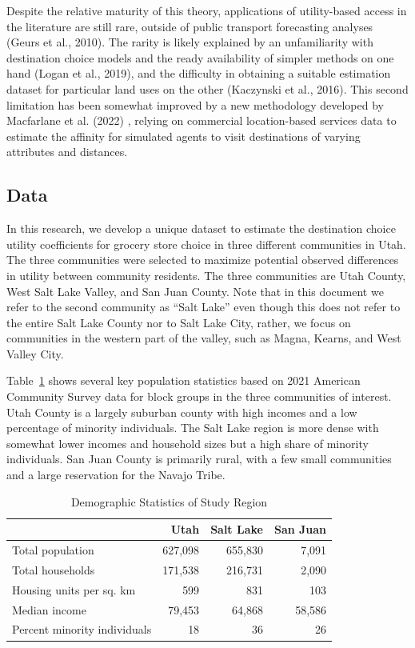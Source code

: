 \documentclass[
  letterpaper,
  authoryear,
  review,
  3p]{elsarticle}
\begin{document}
Despite the relative maturity of this theory, applications of
utility-based access in the literature are still rare, outside of public
transport forecasting analyses (Geurs et al., 2010). The rarity is
likely explained by an unfamiliarity with destination choice models and
the ready availability of simpler methods on one hand (Logan et al.,
2019), and the difficulty in obtaining a suitable estimation dataset for
particular land uses on the other (Kaczynski et al., 2016). This second
limitation has been somewhat improved by a new methodology developed by
Macfarlane et al. (2022) , relying on commercial location-based services
data to estimate the affinity for simulated agents to visit destinations
of varying attributes and distances.

\hypertarget{data}{%
\subsection{Data}\label{data}}

In this research, we develop a unique dataset to estimate the
destination choice utility coefficients for grocery store choice in
three different communities in Utah. The three communities were selected
to maximize potential observed differences in utility between community
residents. The three communities are Utah County, West Salt Lake Valley,
and San Juan County. Note that in this document we refer to the second
community as ``Salt Lake'' even though this does not refer to the entire
Salt Lake County nor to Salt Lake City, rather, we focus on communities
in the western part of the valley, such as Magna, Kearns, and West
Valley City.

Table~\ref{tbl-acsdata} shows several key population statistics based on
2021 American Community Survey data for block groups in the three
communities of interest. Utah County is a largely suburban county with
high incomes and a low percentage of minority individuals. The Salt Lake
region is more dense with somewhat lower incomes and household sizes but
a high share of minority individuals. San Juan County is primarily
rural, with a few small communities and a large reservation for the
Navajo Tribe.

\hypertarget{tbl-acsdata}{}
\begin{table}
\caption{\label{tbl-acsdata}Demographic Statistics of Study Region }\tabularnewline

\centering
\begin{tabular}[t]{lrrr}
\toprule
 & Utah & Salt Lake & San Juan\\
\midrule
Total population & 627,098 & 655,830 & 7,091\\
Total households & 171,538 & 216,731 & 2,090\\
Housing units per sq. km & 599 & 831 & 103\\
Median income & 79,453 & 64,868 & 58,586\\
Percent minority individuals & 18 & 36 & 26\\
\bottomrule
\end{tabular}
\end{table}
\end{document}
